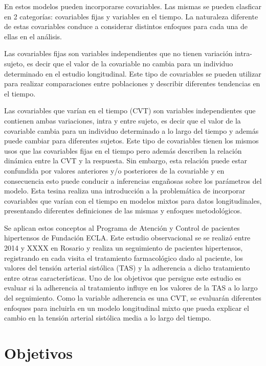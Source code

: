 \documentclass[spanish]{article}
\numberwithin{figure}{subsection}
\numberwithin{equation}{subsection}
\numberwithin{table}{subsection}
\begin{document}
En estos modelos pueden incorporarse covariables. Las mismas se pueden clasficar
en 2 categorías: covariables fijas y variables en el tiempo. La naturaleza
diferente de estas covariables conduce a considerar distintos enfoques para cada
una de ellas en el análisis.

Las covariables fijas son variables independientes que no tienen variación
intra-sujeto, es decir que el valor de la covariable no cambia para un individuo
determinado en el estudio longitudinal. Este tipo de covariables se pueden
utilizar para realizar comparaciones entre poblaciones y describir diferentes
tendencias en el tiempo.

Las covariables que varían en el tiempo (CVT) son variables independientes que
contienen ambas variaciones, intra y entre sujeto, es decir que el valor de la
covariable cambia para un individuo determinado a lo largo del tiempo y además
puede cambiar para diferentes sujetos. Este tipo de covariables tienen los
mismos usos que las covariables fijas en el tiempo pero además describen la
relación dinámica entre la CVT y la respuesta. Sin embargo, esta relación puede
estar confundida por valores anteriores y/o posteriores de la covariable y en
consecuencia esto puede conducir a inferencias engañosas sobre los parámetros
del modelo. Esta tesina realiza una introducción a la problemática de
incorporar covariables que varían con el tiempo en modelos mixtos para datos
longitudinales, presentando diferentes definiciones de las mismas y enfoques
metodológicos.

Se aplican estos conceptos al Programa de Atención y Control de pacientes
hipertensos de Fundación ECLA. Este estudio observacional se se realizó entre
2014 y XXXX en Rosario y realiza un seguimiento de pacientes hipertensos,
registrando en cada visita el tratamiento farmacológico dado al paciente, los
valores del tensión arterial sistólica (TAS) y la adherencia a dicho tratamiento
entre otras características. Uno de los objetivos que persigue este estudio es
evaluar si la adherencia al tratamiento influye en los valores de la TAS a lo
largo del seguimiento. Como la variable adherencia es una CVT, se evaluarán
diferentes enfoques para incluirla en un modelo longitudinal mixto que pueda
explicar el cambio en la tensión arterial sistólica media a lo largo del tiempo.

\newpage
\section{Objetivos}
\end{document}
